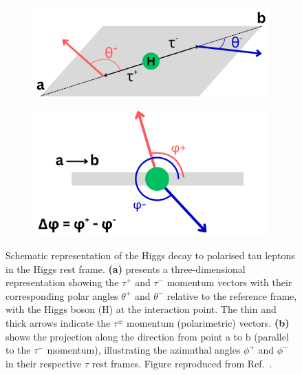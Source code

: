 \begin{figure}[!htbp]
    \centering
    \begin{subfigure}{0.45\textwidth}
        \centering
        \includegraphics[width=1\textwidth]{Figures/Chapter2/PolarimetricVector_Definition_1.pdf}
        \caption{}
    \end{subfigure}
    \hfill
    \begin{subfigure}{0.45\textwidth}
        \centering
        \includegraphics[width=1\textwidth]{Figures/Chapter2/PolarimetricVector_Definition_2.pdf}
        \caption{}
    \end{subfigure}
\caption[Schematic representation of the Higgs decay to polarised tau leptons in the
Higgs rest frame]{Schematic representation of the Higgs decay to polarised tau leptons in the
Higgs rest frame. \textbf{(a)} presents a three-dimensional representation showing the $\tau^+$ and $\tau^-$ momentum vectors with their corresponding polar angles $\theta^+$ and $\theta^-$ relative to the reference frame, with the Higgs boson (H) at the interaction point. The thin and thick arrows indicate the $\tau^\pm$ momentum (polarimetric) vectors. \textbf{(b)} shows the projection along the direction from point a to b (parallel to the $\tau^-$ momentum), illustrating the azimuthal angles $\phi^+$ and $\phi^-$ in their respective $\tau$ rest frames. Figure reproduced from Ref.~\cite{PolarimetricVectorDefinition}.}
\label{Figure:Chapter2_PolarimetricVector_Definition}
\end{figure}


